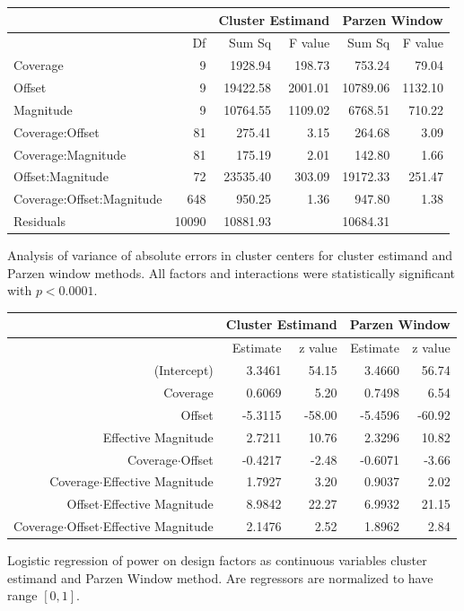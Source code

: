 \begin{FPtable}
\begin{sideways}
\begin{tabular}{lr|rr|rr}
\hline 
 &  & \multicolumn{2}{c|}{Cluster Estimand} & \multicolumn{2}{c}{Parzen Window}\tabularnewline
\hline 
 & Df  & Sum Sq  & F value  & Sum Sq  & F value \tabularnewline
\hline 
Coverage & 9  & 1928.94  & 198.73  & 753.24  & 79.04 \tabularnewline
Offset  & 9  & 19422.58  & 2001.01  & 10789.06  & 1132.10 \tabularnewline
Magnitude  & 9  & 10764.55  & 1109.02 & 6768.51  & 710.22 \tabularnewline
Coverage:Offset  & 81  & 275.41  & 3.15 & 264.68  & 3.09 \tabularnewline
Coverage:Magnitude  & 81  & 175.19  & 2.01 & 142.80  & 1.66 \tabularnewline
Offset:Magnitude  & 72  & 23535.40  & 303.09 & 19172.33  & 251.47 \tabularnewline
Coverage:Offset:Magnitude  & 648  & 950.25  & 1.36  & 947.80  & 1.38 \tabularnewline
Residuals  & 10090  & 10881.93  &  & 10684.31  & \tabularnewline
\hline 
\end{tabular}
\end{sideways}
\caption{Analysis of variance of absolute errors in cluster centers for cluster estimand and Parzen window methods. All factors and interactions were statistically significant with $p<0.0001$.
\label{nucleosomes:tab:clusterAnova}
\vspace{72pt}}
\end{FPtable}
\afterpage{\clearpage}

\begin{FPtable}
\begin{sideways}
\begin{tabular}{r|rr|rr}
\hline 
 & \multicolumn{2}{c|}{Cluster Estimand} & \multicolumn{2}{c}{Parzen Window}\tabularnewline
\hline 
 & Estimate  & z value  & Estimate  & z value \tabularnewline
\hline 
(Intercept)  & 3.3461  & 54.15  & 3.4660  & 56.74 \tabularnewline
Coverage & 0.6069  & 5.20  & 0.7498  & 6.54 \tabularnewline
Offset  & -5.3115  & -58.00  & -5.4596  & -60.92 \tabularnewline
Effective Magnitude  & 2.7211  & 10.76  & 2.3296  & 10.82 \tabularnewline
Coverage$\cdot$Offset  & -0.4217  & -2.48  & -0.6071  & -3.66 \tabularnewline
Coverage$\cdot$Effective Magnitude  & 1.7927  & 3.20  & 0.9037  & 2.02 \tabularnewline
Offset$\cdot$Effective Magnitude  & 8.9842  & 22.27  & 6.9932  & 21.15 \tabularnewline
Coverage$\cdot$Offset$\cdot$Effective Magnitude  & 2.1476  & 2.52  & 1.8962  & 2.84 \tabularnewline
\hline 
\end{tabular}
\end{sideways}
\caption{Logistic regression of power on design factors as continuous variables
cluster estimand and Parzen Window method. Are regressors are normalized
to have range $[0,1]$.
\label{nucleosomes:tab:clusterGlm}
\vspace{144pt}}
\end{FPtable}
\afterpage{\clearpage}



